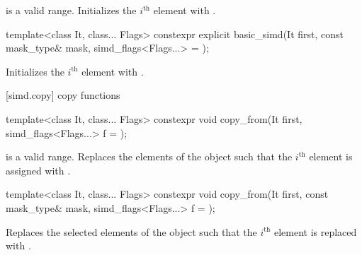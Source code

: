 \begin{itemdescr}
  \SimdLoadDescr
    { is a valid range.}
    {Initializes the $i^\text{th}$ element with 
    \foralli.}
\end{itemdescr}

\begin{itemdecl}
template<class It, class... Flags>
  constexpr explicit basic_simd(It first, const mask_type& mask, simd_flags<Flags...> = {});
\end{itemdecl}

\begin{itemdescr}
  \SimdLoadDescr
    {\validMaskedRange}
    {Initializes the $i^\text{th}$ element with 
    \foralli.}
\end{itemdescr}

[simd.copy]{ copy functions}

\begin{itemdecl}
template<class It, class... Flags>
  constexpr void copy_from(It first, simd_flags<Flags...> f = {});
\end{itemdecl}

\begin{itemdescr}
  \SimdLoadDescr
    { is a valid range.}
    {Replaces the elements of the  object such that the $i^\text{th}$ element is
    assigned with  \foralli.}
\end{itemdescr}

\begin{itemdecl}
template<class It, class... Flags>
  constexpr void copy_from(It first, const mask_type& mask, simd_flags<Flags...> f = {});
\end{itemdecl}

\begin{itemdescr}
  \SimdLoadDescr
    {\validMaskedRange}
    {Replaces the selected elements of the  object such that the $i^\text{th}$
    element is replaced with  \forallmaskedi.}
\end{itemdescr}

\newcommand\SimdStoreDescr[2]{
  \pnum\constraints
  \begin{itemize}
    \item \tcode{iter_value_t<Out>} is a vectorizable type, and
    \item \tcode{Out} models \tcode{contiguous_iterator}, and
    \item \tcode{Out} models \tcode{indirectly_writable<value_type>}.
  \end{itemize}

  \pnum\mandates
  \conversionFlagsMandate{value_type}{iter_value_t<Out>}

  \pnum\expects
  \begin{itemize}
    \item #1
    \flagsRequires{basic_simd, iter_value_t<Out>}{iter_value_t<Out>}
  \end{itemize}

  \pnum\effects #2
}

